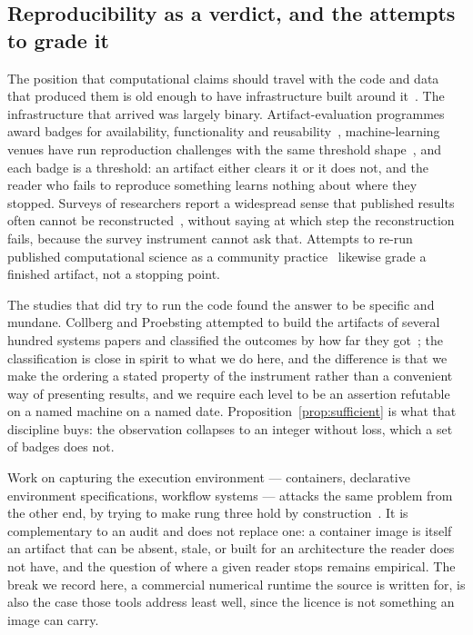 \subsection{Reproducibility as a verdict, and the attempts to grade it}

The position that computational claims should travel with the code and data that
produced them is old enough to have infrastructure built around
it~\cite{claerbout1992electronic,fomel2009reproducible,peng2011reproducible,
donoho2010invitation,ince2012open,vandewalle2009repro,stodden2014practices,
sandve2013ten,wilson2014best,wilson2017good,gundersen2021fundamental}. The
infrastructure that arrived was largely binary. Artifact-evaluation programmes
award badges for availability, functionality and
reusability~\cite{acmbadging2020}, machine-learning venues have run reproduction
challenges with the same threshold shape~\cite{pineau2021improving}, and each
badge is a threshold: an artifact either clears it or it does not, and the
reader who fails to reproduce something learns nothing about where they stopped.
Surveys of researchers report a widespread sense that published results often
cannot be reconstructed~\cite{baker2016reproducibility,nature2016reality,
hutson2018ai,gundersen2018state}, without saying at which step the
reconstruction fails, because the survey instrument cannot ask that. Attempts to
re-run published computational science as a community
practice~\cite{rougier2017rescience,landis2012transparent,nosek2015culture,
benureau2018rerun,haibekains2020transparency,heil2021reproducibility}
likewise grade a finished artifact, not a stopping point.

The studies that did try to run the code found the answer to be specific and
mundane. Collberg and Proebsting attempted to build the artifacts of several
hundred systems papers and classified the outcomes by how far they
got~\cite{collberg2016repeatability}; the classification is close in spirit to
what we do here, and the difference is that we make the ordering a stated
property of the instrument rather than a convenient way of presenting results,
and we require each level to be an assertion refutable on a named machine on a
named date. Proposition~\ref{prop:sufficient} is what that discipline buys: the
observation collapses to an integer without loss, which a set of badges does
not.

Work on capturing the execution environment --- containers, declarative
environment specifications, workflow systems --- attacks the same problem from
the other end, by trying to make rung three hold by
construction~\cite{boettiger2015docker,kurtzer2017singularity,
stodden2014practices,sandve2013ten}.
It is complementary to an audit and does not replace one: a container image is
itself an artifact that can be absent, stale, or built for an architecture the
reader does not have, and the question of where a given reader stops remains
empirical. The break we record here, a commercial numerical runtime the source
is written for, is also the case those tools address least well, since the
licence is not something an image can carry.

